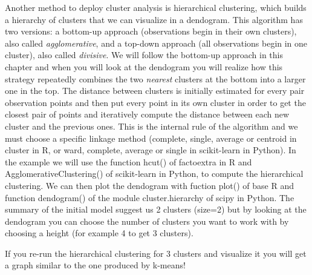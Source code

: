 
Another method to deploy cluster analysis is hierarchical clustering, which builds a hierarchy of clusters that we can visualize in a dendogram.  This algorithm has two versions: a bottom-up approach (observations begin in their own clusters), also called \textit{agglomerative}, and a top-down approach (all observations begin in one cluster), also called \textit{divisive}. We will follow the bottom-up approach in this chapter and when you will look at the dendogram you will realize how this strategy repeatedly combines the two \textit{nearest} clusters at the bottom into a larger one in the top. The distance between clusters is initially estimated for every pair observation points and then put every point in its own cluster in order to get the closest pair of points and iteratively compute the distance between each new cluster and the previous ones. This is the internal rule of the algorithm and we must choose a specific linkage method (complete, single, average or centroid in cluster in R, or ward, complete, average or single in scikit-learn in Python). In the example we will use the function hcut() of factoextra in R and AgglomerativeClustering() of scikit-learn in Python, to compute the hierarchical clustering. We can then plot the dendogram  with fuction plot() of base R and function dendogram() of the module cluster.hierarchy of scipy in Python. The summary of the initial model suggest us 2 clusters (size=2) but by looking at the dendogram you can choose the number of clusters you want to work with by choosing a height (for example 4 to get 3 clusters). 


If you re-run the hierarchical clustering for 3 clusters and visualize it you will get a graph similar to the one produced by k-means!


